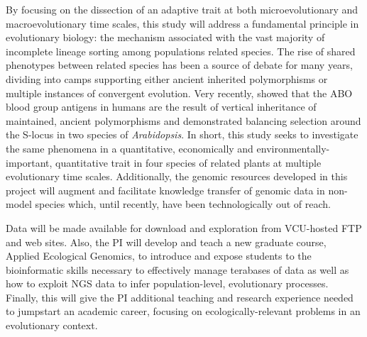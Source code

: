 By focusing on the dissection of an adaptive trait at both microevolutionary and macroevolutionary 
time scales, this study will address a fundamental principle in evolutionary biology: the mechanism 
associated with the vast majority of incomplete lineage sorting among populations related species.  
The rise of shared phenotypes between related species has been a source of debate for many years, dividing 
into camps supporting either ancient inherited polymorphisms or multiple instances of convergent evolution.  Very recently, 
\citet{Segurel:vf} showed that the ABO blood group antigens in humans are the result of vertical inheritance 
of maintained, ancient polymorphisms and \citet{Roux:2012eb} demonstrated balancing selection around the S-locus in two 
species of  \emph{Arabidopsis}.  
In short, this study seeks to investigate the same phenomena in a quantitative, economically and 
environmentally-important, quantitative trait in four species of related plants at multiple evolutionary time scales.  Additionally, 
the genomic resources developed in this project will augment and facilitate knowledge transfer of genomic data in non-model 
species which, until recently, have been technologically out of reach.



Data will be made available for download and exploration from VCU-hosted FTP and web sites.  Also, the PI will develop and teach a new 
graduate course, Applied Ecological Genomics, to introduce and expose students to the bioinformatic skills necessary 
to effectively manage terabases of data as well as how to exploit NGS data to infer population-level, evolutionary processes.   
Finally, this will give the PI additional teaching and research experience needed to jumpstart an academic career, focusing on 
ecologically-relevant problems in an evolutionary context.

